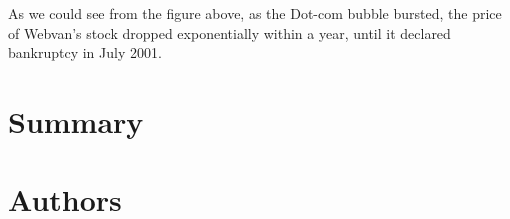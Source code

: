 \noindent As we could see from the figure above, as the Dot-com bubble bursted, the price of Webvan's stock dropped exponentially within a year, until it declared bankruptcy in July 2001.  

\section{Summary}



\section{Authors}

\address{Duncan Cummings\\
  Williams College\\
  Williamstown, MA\\
  USA\\}

\address{David Kane\\
  Hutchin Hill Capital\\
  Address\\
  Country\\}

\address{Andy Yu Zhu Yao\\
  Williams College\\
  Williamstown, MA\\
  USA\\}
